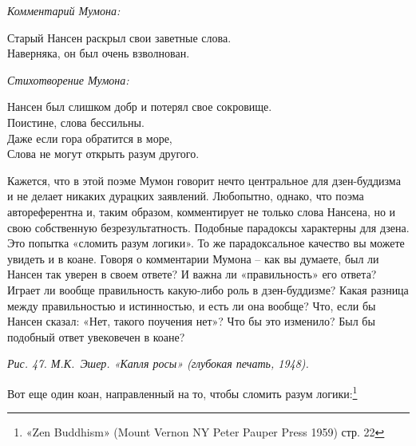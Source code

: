 \documentclass[../main.tex]{subfiles}
\begin{document}
\begin{koan}
    \emph{\normalsize Комментарий Мумона:}
    \vspace{2pt}

    Старый Нансен раскрыл свои заветные слова. \\
    Наверняка, он был очень взволнован.
\end{koan}

\begin{koan}
    \emph{\normalsize Стихотворение Мумона:}

    \begin{mumonverse}
        Нансен был слишком добр и потерял свое сокровище. \\
        Поистине, слова бессильны. \\
        Даже если гора обратится в море, \\
        Слова не могут открыть разум другого.
    \end{mumonverse}
\end{koan}

Кажется, что в этой поэме Мумон говорит нечто центральное для дзен-буддизма и не делает никаких дурацких заявлений. Любопытно, однако, что поэма автореферентна и, таким образом, комментирует не только слова Нансена, но и свою собственную безрезультатность. Подобные парадоксы характерны для дзена. Это попытка «сломить разум логики». То же парадоксальное качество вы можете увидеть и в коане. Говоря о комментарии Мумона \--- как вы думаете, был ли Нансен так уверен в своем ответе? И важна ли «правильность» его ответа? Играет ли вообще правильность какую-либо роль в дзен-буддизме? Какая разница между правильностью и истинностью, и есть ли она вообще? Что, если бы Нансен сказал: «Нет, такого поучения нет»? Что бы это изменило? Был бы подобный ответ увековечен в коане?

\emph{Рис. 47. М.К.~Эшер. «Капля росы» (глубокая печать, 1948).}

Вот еще один коан, направленный на то, чтобы сломить разум логики:\footnote{«Zen Buddhism» (Mount Vernon NY Peter Pauper Press 1959) стр. 22}
\end{document}
